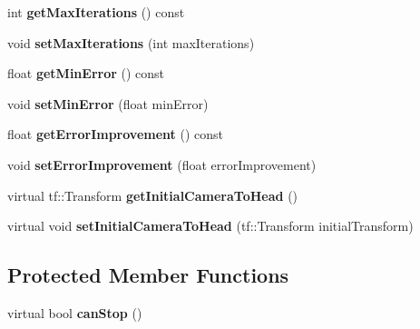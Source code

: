 \begin{DoxyCompactItemize}
\item 
\hypertarget{classCameraTransformOptimization_ac9e55b35f8ee89aff5bb3d33301f420f}{int {\bfseries get\-Max\-Iterations} () const }\label{classCameraTransformOptimization_ac9e55b35f8ee89aff5bb3d33301f420f}

\item 
\hypertarget{classCameraTransformOptimization_a04ea90d9c105f077afad21d88a3cddc4}{void {\bfseries set\-Max\-Iterations} (int max\-Iterations)}\label{classCameraTransformOptimization_a04ea90d9c105f077afad21d88a3cddc4}

\item 
\hypertarget{classCameraTransformOptimization_af4e92403855d44d3abb3d81a33ea3be9}{float {\bfseries get\-Min\-Error} () const }\label{classCameraTransformOptimization_af4e92403855d44d3abb3d81a33ea3be9}

\item 
\hypertarget{classCameraTransformOptimization_a2bc589d6107bde5c4c9485cc40df2693}{void {\bfseries set\-Min\-Error} (float min\-Error)}\label{classCameraTransformOptimization_a2bc589d6107bde5c4c9485cc40df2693}

\item 
\hypertarget{classCameraTransformOptimization_ae46ae0f7bf817dc0f1cd1528f3e40a40}{float {\bfseries get\-Error\-Improvement} () const }\label{classCameraTransformOptimization_ae46ae0f7bf817dc0f1cd1528f3e40a40}

\item 
\hypertarget{classCameraTransformOptimization_a0234fcab0dea261cc3c998af4a95a76a}{void {\bfseries set\-Error\-Improvement} (float error\-Improvement)}\label{classCameraTransformOptimization_a0234fcab0dea261cc3c998af4a95a76a}

\item 
\hypertarget{classCameraTransformOptimization_a5cd1ad3be856ba781dd5ce7a29ae3401}{virtual tf\-::\-Transform {\bfseries get\-Initial\-Camera\-To\-Head} ()}\label{classCameraTransformOptimization_a5cd1ad3be856ba781dd5ce7a29ae3401}

\item 
\hypertarget{classCameraTransformOptimization_a3e576d28d6fce0310bb35aa03e9d1223}{virtual void {\bfseries set\-Initial\-Camera\-To\-Head} (tf\-::\-Transform initial\-Transform)}\label{classCameraTransformOptimization_a3e576d28d6fce0310bb35aa03e9d1223}

\end{DoxyCompactItemize}
\subsection*{\-Protected \-Member \-Functions}
\begin{DoxyCompactItemize}
\item 
\hypertarget{classCameraTransformOptimization_a51edcef959641febc34e4191e049acf3}{virtual bool {\bfseries can\-Stop} ()}\label{classCameraTransformOptimization_a51edcef959641febc34e4191e049acf3}

\end{DoxyCompactItemize}

